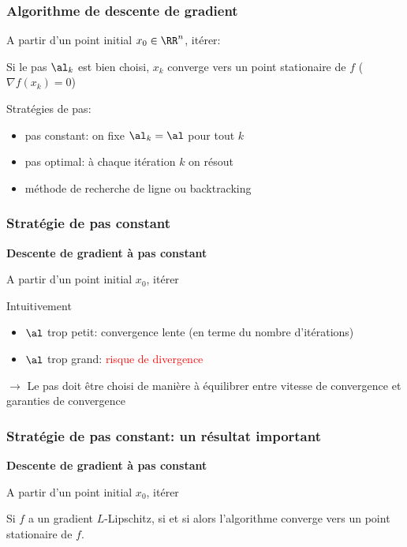 \documentclass[9pt,table]{beamer} %
\begin{document}
\begin{frame}
\frametitle{Algorithme de descente de gradient}

\begin{tcolorbox}
	A partir d'un point initial $x_0 \in \RR^n$, itérer:
\end{tcolorbox}

	Si le pas $\al_k$ est bien choisi, $x_k$ converge vers un point stationaire de $f$ (\ie $\nabla f(x_k) = 0$)
	
	\alert{Stratégies de pas}:
	\begin{itemize}[label=-]
		\item pas constant: on fixe $\al_k = \al$ pour tout $k$
		\item pas optimal: à chaque itération $k$ on résout
		\item méthode de recherche de ligne ou \alert{backtracking}
	\end{itemize}
\end{frame}


\begin{frame}
\frametitle{Stratégie de pas constant}

\textbf{\alert{Descente de gradient à pas constant}}
\begin{tcolorbox}
	A partir d'un point initial $x_0$, itérer
\end{tcolorbox}

Intuitivement
\begin{itemize}[label=\tiny$\blacksquare$]
	\item $\al$ trop petit: convergence lente (en terme du nombre d'itérations)
	\item $\al$ trop grand: \textcolor{red}{risque de divergence}
\end{itemize}

$\rightarrow$ Le pas doit être choisi de manière à équilibrer entre vitesse de convergence et garanties de convergence

\end{frame}


\begin{frame}
\frametitle{Stratégie de pas constant: un résultat important}

\textbf{\alert{Descente de gradient à pas constant}}
\begin{tcolorbox}
	A partir d'un point initial $x_0$, itérer
\end{tcolorbox}

\begin{tcolorbox}[colback=teal!20]
\begin{thm}
	
	Si $f$ a un gradient $L$-Lipschitz, \ie si
	et si  alors l'algorithme converge vers un point stationaire de $f$.
\end{thm}
\end{tcolorbox}

\end{frame}
\end{document}
